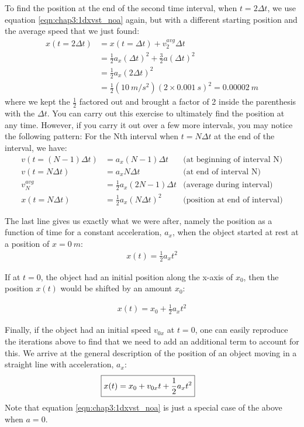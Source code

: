 To find the position at the end of the second time interval, when $t=2\Delta t$, we use equation \ref{eqn:chap3:1dxvst_noa} again, but with a different starting position and the average speed that we just found:
\begin{align*}
x(t=2\Delta t) &= x(t=\Delta t) +v_2^{avg}\Delta t\\
&= \frac{1}{2}a_x(\Delta t)^2+\frac{3}{2}a(\Delta t)^2\\
&= \frac{1}{2}a_x(2\Delta t)^2\\
&=\frac{1}{2}(\SI{10}{m/s^2})(2\times\SI{0.001}{s})^2=\SI{0.00002}{m}
\end{align*}
where we kept the $\frac{1}{2}$ factored out and brought a factor of 2 inside the parenthesis with the $\Delta t$. You can carry out this exercise to ultimately find the position at any time. However, if you carry it out over a few more intervals, you may notice the following pattern: For the Nth interval when $t=N\Delta t$ at the end of the interval, we have:
\begin{align*}
v(t=(N-1)\Delta t) &= a_x (N-1) \Delta t &\text{(at beginning of interval N)}\\
v(t=N\Delta t) &= a_x N \Delta t &\text{(at end of interval N)}\\
v_N^{avg}&=\frac{1}{2}a_x(2N-1)\Delta t&\text{(average during interval)}\\
x(t=N\Delta t)&=\frac{1}{2}a_x(N\Delta t)^2&\text{(position at end of interval)}
\end{align*}

The last line gives us exactly what we were after, namely the position as a function of time for a constant acceleration, $a_x$, when the object started at rest at a position of $x=\SI{0}{m}$:
\begin{align}
\label{eqn:chap3:1dxoft_novonoxo}
 x(t) = \frac{1}{2} a_x t^2
\end{align}

If at $t=0$, the object had an initial position along the x-axis of $x_0$, then the position $x(t)$ would be shifted by an amount $x_0$:

\begin{align}
\label{eqn:chap3:1dxoft_novo}
 x(t) = x_0+\frac{1}{2} a_x t^2
\end{align}

Finally, if the object had an initial speed $v_{0x}$ at $t=0$, one can easily reproduce the iterations above to find that we need to add an additional term to account for this. We arrive at the general description of the position of an object moving in a straight line with acceleration, $a_x$:
\begin{align}
\label{eqn:chap3:1dxvst}
\Aboxed{ x(t) = x_0+v_{0x}t+ \frac{1}{2}a_xt^2}
\end{align}
Note that equation \ref{eqn:chap3:1dxvst_noa} is just a special case of the above when $a=0$. 

